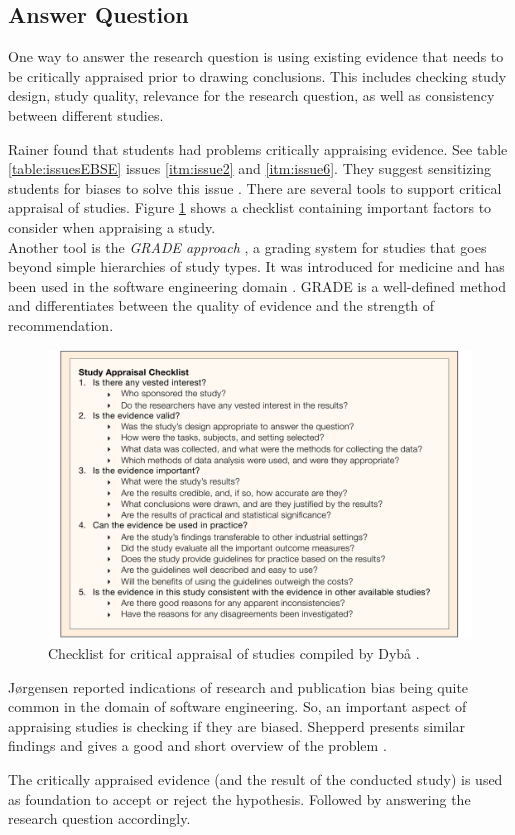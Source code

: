 
\subsection{Answer Question}
\label{subsec:answer question}
One way to answer the research question is using existing evidence that needs to be critically appraised prior to drawing conclusions. This includes checking study design, study quality, relevance for the research question, as well as consistency between different studies. 

Rainer \etal found that students had problems critically appraising evidence. See table \ref{table:issuesEBSE} issues \ref{itm:issue2} and \ref{itm:issue6}. They suggest sensitizing students for biases to solve this issue \cite{Rainer2006}. There are several tools to support critical appraisal of studies. Figure \ref{fig:critical appraisal} shows a checklist containing important factors to consider when appraising a study.\\
Another tool is the \emph{GRADE approach} \cite{Atkins2004}, a grading system for studies that goes beyond simple hierarchies of study types. It was introduced for medicine and has been used in the software engineering domain \cite{Wohlin2013EvidenceProfile,Dyba2008}. GRADE is a well-defined method and differentiates between the quality of evidence and the strength of recommendation.

\begin{figure}
	\centering
	\includegraphics[width=12cm]{figures/study_appraisal.pdf}
\caption{Checklist for critical appraisal of studies compiled by Dyb{\aa} \etal \cite{Dyba2005}.}
\label{fig:critical appraisal}
\end{figure}

J{\o}rgensen \etal \cite{Jorgensen2016} reported indications of research and publication bias being quite common in the domain of software engineering. So, an important aspect of appraising studies is checking if they are biased. Shepperd presents similar findings and gives a good and short overview of the problem \cite{Shepperd2015}.

The critically appraised evidence (and the result of the conducted study) is used as foundation to accept or reject the hypothesis. Followed by answering the research question accordingly.






